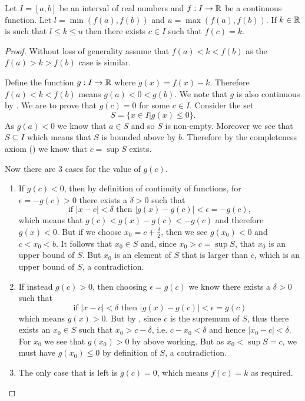 \begin{theorem}\label{thrm-intermediate-value-theorem}
    Let $I = [a, b]$ be an interval of real numbers and $f: I \to \mathbb{R}$ be a continuous function. Let $l = \min(f(a), f(b))$ and $u = \max(f(a), f(b))$. If $k \in \mathbb{R}$ is such that $l \leq k \leq u$ then there exists $c \in I$ such that $f(c) = k$.
\end{theorem}
\begin{proof}
    Without loss of generality assume that $f(a) < k < f(b)$ as the $f(a) > k > f(b)$ case is similar.

    Define the function $g: I \to \mathbb{R}$ where $g(x) = f(x) - k$. Therefore $f(a) < k < f(b)$ means $g(a) < 0 < g(b)$. We note that $g$ is also continuous by . We are to prove that $g(c) = 0$ for some $c \in I$. Consider the set
    \[
        S = \{x \in I \vert g(x) \leq 0\}.
    \]
    As $g(a) < 0$ we know that $a \in S$ and so $S$ is non-empty. Moreover we see that $S \subseteq I$ which means that $S$ is bounded above by $b$. Therefore by the completeness axiom () we know that $c = \sup S$ exists.

    Now there are 3 cases for the value of $g(c)$.
    \begin{enumerate}
        \item If $g(c) < 0$, then by definition of continuity of functions, for $\epsilon = -g(c) > 0$ there exists a $\delta > 0$ such that
        \[
            \text{if } |x - c| < \delta \text{ then } |g(x) - g(c)| < \epsilon = -g(c),
        \]
        which means that $g(c) < g(x) - g(c) < -g(c)$ and therefore $g(x) < 0$. But if we choose $x_0 = c + \frac\delta2$, then we see $g(x_0) < 0$ and $c < x_0 < b$. It follows that $x_0 \in S$ and, since $x_0 > c = \sup S$, that $x_0$ is an upper bound of $S$. But $x_0$ is an element of $S$ that is larger than $c$, which is an upper bound of $S$, a contradiction.

        \item If instead $g(c) > 0$, then choosing $\epsilon = g(c)$ we know there exists a $\delta > 0$ such that
        \[
            \text{if } |x - c| < \delta \text{ then } |g(x) - g(c)| < \epsilon = g(c)
        \]
        which means $g(x) > 0$. But by , since $c$ is the supremum of $S$, thus there exists an $x_0 \in S$ such that $x_0 > c - \delta$, i.e. $c - x_0 < \delta$ and hence $|x_0 - c| < \delta$. For $x_0$ we see that $g(x_0) > 0$ by above working. But as $x_0 < \sup S = c$, we must have $g(x_0) \leq 0$ by definition of $S$, a contradiction.

        \item The only case that is left is $g(c) = 0$, which means $f(c) = k$ as required.\qedhere
    \end{enumerate}
\end{proof}

